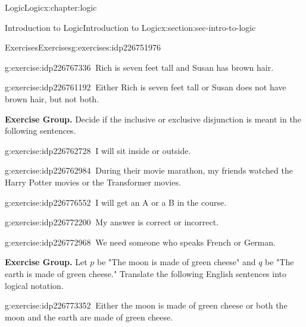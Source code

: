 \documentclass[twoside,10pt,]{book}
\numberwithin{equation}{section}
\begin{document}
\begin{chapterptx}{Logic}{}{Logic}{}{}{x:chapter:logic}
\begin{sectionptx}{Introduction to Logic}{}{Introduction to Logic}{}{}{x:section:sec-intro-to-logic}
\begin{exercises-subsection}{Exercises}{}{Exercises}{}{}{g:exercises:idp226751976}
\begin{exercisegroup}
\begin{divisionexerciseeg}{10}{}{}{g:exercise:idp226767336}%
\(\ \)Rich is seven feet tall and Susan has brown hair.\end{divisionexerciseeg}%
\begin{divisionexerciseeg}{11}{}{}{g:exercise:idp226761192}%
\(\ \)Either Rich is seven feet tall or Susan does not have brown hair, but not both.\end{divisionexerciseeg}%
\end{exercisegroup}
\par\medskip\noindent
\par\medskip\noindent%
\textbf{Exercise Group.}\space\space%
Decide if the inclusive or exclusive disjunction is meant in the following sentences.\begin{exercisegroup}
\begin{divisionexerciseeg}{12}{}{}{g:exercise:idp226762728}%
\(\ \)I will sit inside or outside.\end{divisionexerciseeg}%
\begin{divisionexerciseeg}{13}{}{}{g:exercise:idp226762984}%
\(\ \)During their movie marathon, my friends watched the Harry Potter movies or the Transformer movies.\end{divisionexerciseeg}%
\begin{divisionexerciseeg}{14}{}{}{g:exercise:idp226776552}%
\(\ \)I will get an A or a B in the course.\end{divisionexerciseeg}%
\begin{divisionexerciseeg}{15}{}{}{g:exercise:idp226772200}%
\(\ \)My answer is correct or incorrect.\end{divisionexerciseeg}%
\begin{divisionexerciseeg}{16}{}{}{g:exercise:idp226772968}%
\(\ \)We need someone who speaks French or German.\end{divisionexerciseeg}%
\end{exercisegroup}
\par\medskip\noindent
\par\medskip\noindent%
\textbf{Exercise Group.}\space\space%
Let \(p\) be "The moon is made of green cheese" and \(q\) be "The earth is made of green cheese."  Translate the following English sentences into logical notation.\begin{exercisegroup}
\begin{divisionexerciseeg}{17}{}{}{g:exercise:idp226773352}%
\(\ \)Either the moon is made of green cheese or both the moon and the earth are made of green cheese.\end{divisionexerciseeg}%

\end{exercisegroup}
\end{exercises-subsection}
\end{sectionptx}
\end{chapterptx}
\end{document}
